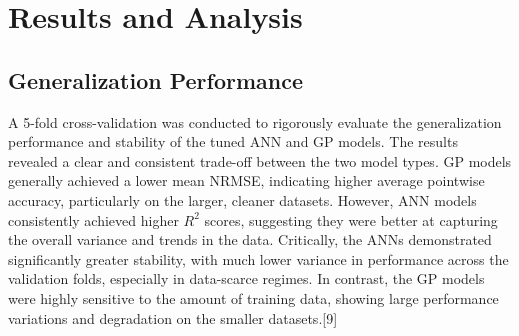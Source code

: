 \documentclass[12pt, a4paper]{report}
\begin{document}
\section{Results and Analysis}

\subsection{Generalization Performance}
A 5-fold cross-validation was conducted to rigorously evaluate the generalization performance and stability of the tuned ANN and GP models. The results revealed a clear and consistent trade-off between the two model types. GP models generally achieved a lower mean NRMSE, indicating higher average pointwise accuracy, particularly on the larger, cleaner datasets. However, ANN models consistently achieved higher $R^2$ scores, suggesting they were better at capturing the overall variance and trends in the data. Critically, the ANNs demonstrated significantly greater stability, with much lower variance in performance across the validation folds, especially in data-scarce regimes. In contrast, the GP models were highly sensitive to the amount of training data, showing large performance variations and degradation on the smaller datasets.[9]
\end{document}
